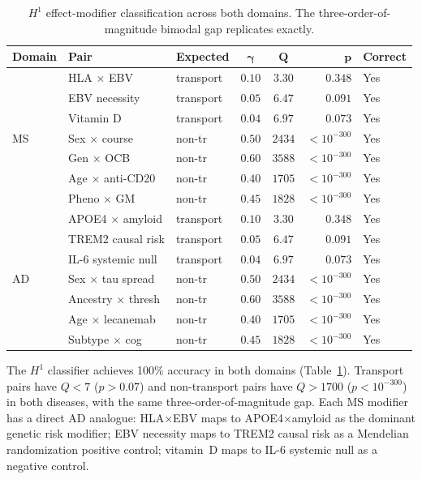 \documentclass{article}
\begin{document}
\begin{table}[t]
\centering
\caption{$H^1$ effect-modifier classification across both domains. The three-order-of-magnitude bimodal gap replicates exactly.}
\label{tab:h1-cross}
\small
\begin{tabular}{@{}lllccrl@{}}
\toprule
\textbf{Domain} & \textbf{Pair} & \textbf{Expected} & $\boldsymbol{\gamma}$ & $\boldsymbol{Q}$ & $\boldsymbol{p}$ & \textbf{Correct} \\
\midrule
\multirow{7}{*}{MS}
& HLA $\times$ EBV & transport & $0.10$ & $3.30$ & $0.348$ & Yes \\
& EBV necessity & transport & $0.05$ & $6.47$ & $0.091$ & Yes \\
& Vitamin D & transport & $0.04$ & $6.97$ & $0.073$ & Yes \\
& Sex $\times$ course & non-tr & $0.50$ & $2434$ & $< 10^{-300}$ & Yes \\
& Gen $\times$ OCB & non-tr & $0.60$ & $3588$ & $< 10^{-300}$ & Yes \\
& Age $\times$ anti-CD20 & non-tr & $0.40$ & $1705$ & $< 10^{-300}$ & Yes \\
& Pheno $\times$ GM & non-tr & $0.45$ & $1828$ & $< 10^{-300}$ & Yes \\
\midrule
\multirow{7}{*}{AD}
& APOE4 $\times$ amyloid & transport & $0.10$ & $3.30$ & $0.348$ & Yes \\
& TREM2 causal risk & transport & $0.05$ & $6.47$ & $0.091$ & Yes \\
& IL-6 systemic null & transport & $0.04$ & $6.97$ & $0.073$ & Yes \\
& Sex $\times$ tau spread & non-tr & $0.50$ & $2434$ & $< 10^{-300}$ & Yes \\
& Ancestry $\times$ thresh & non-tr & $0.60$ & $3588$ & $< 10^{-300}$ & Yes \\
& Age $\times$ lecanemab & non-tr & $0.40$ & $1705$ & $< 10^{-300}$ & Yes \\
& Subtype $\times$ cog & non-tr & $0.45$ & $1828$ & $< 10^{-300}$ & Yes \\
\bottomrule
\end{tabular}
\end{table}

The $H^1$ classifier achieves 100\% accuracy in both domains (Table~\ref{tab:h1-cross}).
Transport pairs have $Q < 7$ ($p > 0.07$) and non-transport pairs have $Q > 1700$ ($p < 10^{-300}$) in both diseases, with the same three-order-of-magnitude gap.
Each MS modifier has a direct AD analogue: HLA$\times$EBV maps to APOE4$\times$amyloid as the dominant genetic risk modifier; EBV necessity maps to TREM2 causal risk as a Mendelian randomization positive control; vitamin~D maps to IL-6 systemic null as a negative control.
\end{document}
